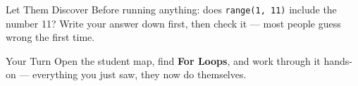 \documentclass[aspectratio=169]{beamer}
\begin{document}
\begin{frame}{Let Them Discover}
    \Large
    Before running anything: does \texttt{range(1, 11)} include the number 11? Write your answer down first, then check it — most people guess wrong the first time.
\end{frame}

\begin{frame}{Your Turn}
    \Large
    Open the student map, find \textbf{For Loops}, and work through it
    hands-on --- everything you just saw, they now do themselves.
\end{frame}
\end{document}
